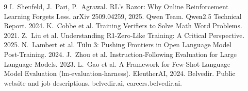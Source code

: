 \documentclass[11pt]{article}
\begin{document}
\begin{thebibliography}{9}\small
\setlength{\itemsep}{0pt}
 I.~Shenfeld, J.~Pari, P.~Agrawal. RL's Razor: Why Online Reinforcement Learning Forgets Less.
  arXiv 2509.04259, 2025.
 Qwen Team. Qwen2.5 Technical Report. 2024.
 K.~Cobbe et al. Training Verifiers to Solve Math Word Problems. 2021.
 Z.~Liu et al. Understanding R1-Zero-Like Training: A Critical Perspective. 2025.
 N.~Lambert et al. T\"ulu 3: Pushing Frontiers in Open Language Model Post-Training. 2024.
 J.~Zhou et al. Instruction-Following Evaluation for Large Language Models. 2023.
 L.~Gao et al. A Framework for Few-Shot Language Model Evaluation (lm-evaluation-harness).
  EleutherAI, 2024.
 Belvedir. Public website and job descriptions. belvedir.ai, careers.belvedir.ai.
\end{thebibliography}
\end{document}
